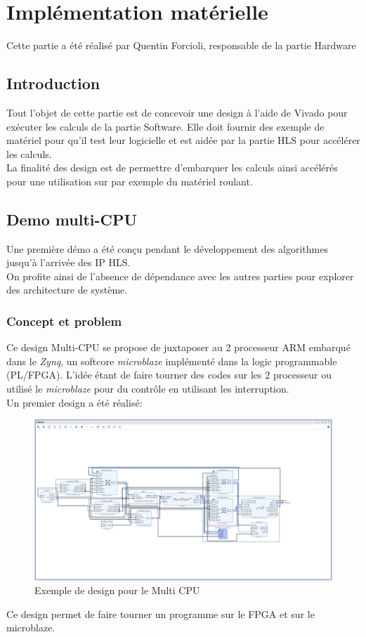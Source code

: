 \documentclass[12pt,a4paper]{ieee}
\begin{document}
\section{Implémentation matérielle}
Cette partie a été réalisé par Quentin Forcioli, responsable de la partie Hardware
\subsection{Introduction}
Tout l'objet de cette partie est de concevoir une design à l'aide de Vivado pour exécuter les calculs de la partie Software. Elle doit fournir des exemple de matériel pour qu'il test leur logicielle et est aidée par la partie HLS pour accélérer les calculs.\\
La finalité des design est de permettre d'embarquer les calculs ainsi accélérés pour une utilisation sur par exemple du matériel roulant.
\subsection{Demo multi-CPU}
Une première démo a été conçu pendant le développement des algorithmes jusqu'à l'arrivée des IP HLS. \\
On profite ainsi de l'absence de dépendance avec les autres parties pour explorer des architecture de système.
\subsubsection{Concept et problem}
Ce design Multi-CPU se propose de juxtaposer au 2 processeur ARM embarqué dans le \textit{Zynq}, un softcore \textit{microblaze} implémenté dans la logic programmable (PL/FPGA). 
L'idée étant de faire tourner des codes sur les 2 processeur ou utilisé le \textit{microblaze} pour du contrôle en utilisant les interruption.
\\
Un premier design a été réalisé:
\begin{figure}[H]
	\centering
		\includegraphics[width=\linewidth]{im/mb1.png}	
	\caption{Exemple de design pour le Multi CPU}
	\label{fig-mb}
\end{figure}
Ce design permet de faire tourner un programme sur le FPGA et sur le microblaze.
\end{document}
